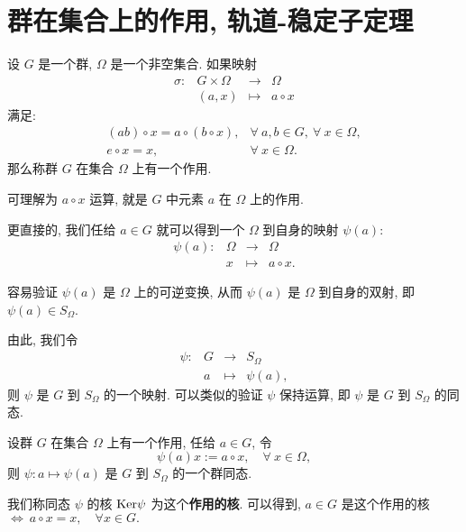 

\section{群在集合上的作用, 轨道-稳定子定理}

\begin{definition}\label{群作用}
	设 $G$ 是一个群, $\Omega$ 是一个非空集合. 如果映射
	$$
	\begin{array}{rccl}
		\sigma:&G\times \Omega & \to & \Omega \\
		&(a,x) & \mapsto & a \circ x
	\end{array}
	$$
	满足:
	$$
	\begin{array}{rl}
		(ab)\circ x=a\circ(b\circ x), & \forall\ a,b \in G,\ \forall\  x\in \Omega, \\
		e\circ x= x, & \forall\ x \in \Omega.
	\end{array}
	$$
	那么称群 $G$ 在集合 $\Omega$ 上有一个作用.
\end{definition}
\begin{remark*}
	可理解为 $a \circ x$ 运算, 就是 $G$ 中元素 $a$ 在 $\Omega$ 上的作用.

	更直接的, 我们任给 $a\in G$ 就可以得到一个 $\Omega$ 到自身的映射 $\psi(a)$:
	$$
	\begin{array}{rccl}
		\psi(a):& \Omega & \to & \Omega \\
		& x & \mapsto & a\circ x.
	\end{array}
	$$

	容易验证 $\psi(a)$ 是 $\Omega$ 上的可逆变换, 从而 $\psi(a)$ 是 $\Omega$ 到自身的双射, 即 $\psi(a) \in S_\Omega$.

	由此, 我们令
	$$
	\begin{array}{rccl}
		\psi: & G &\to&S_\Omega \\
		& a & \mapsto & \psi(a),
	\end{array}
	$$
	则 $\psi$ 是 $G$ 到 $S_\Omega$ 的一个映射. 可以类似的验证 $\psi$ 保持运算, 即 $\psi$ 是 $G$ 到 $S_\Omega$ 的同态.
\end{remark*}
\begin{proposition}
	设群 $G$ 在集合 $\Omega$ 上有一个作用, 任给 $a\in G$, 令
	$$\psi(a)x:=a\circ x,\quad \forall\ x\in \Omega,$$
	则 $\psi:a\mapsto\psi(a)$ 是 $G$ 到 $S_\Omega$ 的一个群同态.
\end{proposition}

\begin{definition}\label{作用的核}
	我们称同态 $\psi$ 的核 $\text {Ker}\psi$ 为这个\textbf{作用的核}. 可以得到, $a\in G$ 是这个作用的核 $\Leftrightarrow\ a\circ x=x,\quad \forall x \in G.$
\end{definition}


